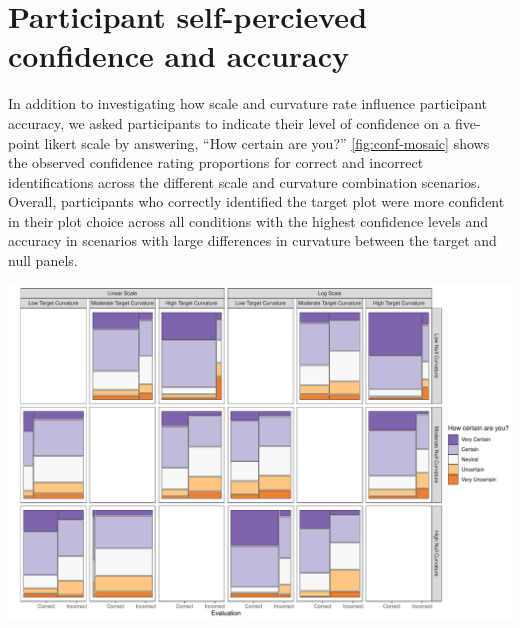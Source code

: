 \documentclass[12pt]{article}
\begin{document}
\hypertarget{participant-self-percieved-confidence-and-accuracy}{%
\section{Participant self-percieved confidence and
accuracy}\label{participant-self-percieved-confidence-and-accuracy}}

In addition to investigating how scale and curvature rate influence
participant accuracy, we asked participants to indicate their level of
confidence on a five-point likert scale by answering, ``How certain are
you?'' \cref{fig:conf-mosaic} shows the observed confidence rating
proportions for correct and incorrect identifications across the
different scale and curvature combination scenarios. Overall,
participants who correctly identified the target plot were more
confident in their plot choice across all conditions with the highest
confidence levels and accuracy in scenarios with large differences in
curvature between the target and null panels.

\begin{center}\includegraphics[width=\linewidth,]{appendix_files/figure-latex/conf-mosaic-1} \end{center}



\end{document}

